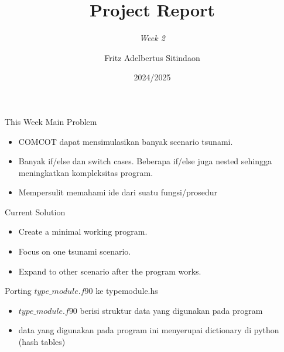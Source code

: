 \documentclass{beamer}
\title{Project Report}
\subtitle{\textit{Week 2}}
\date[]{2024/2025}
\author[Fritz]{Fritz Adelbertus Sitindaon}
\begin{document}
\begin{frame}
\titlepage
\end{frame}


\begin{frame}{This Week Main Problem}
    \begin{itemize}
        \item COMCOT dapat mensimulasikan banyak scenario tsunami.
        \item Banyak if/else dan switch cases. Beberapa if/else juga nested sehingga
        meningkatkan kompleksitas program.
        \item Mempersulit memahami ide dari suatu fungsi/prosedur
    \end{itemize}
\end{frame}

\begin{frame}{Current Solution}
    \begin{itemize}
        \item Create a minimal working program. 
        \item Focus on one tsunami scenario.
        \item Expand to other scenario after the program works.
    \end{itemize}
\end{frame}


\begin{frame}{Porting $type\_module.f90$ ke typemodule.hs}
    \begin{itemize}
        \item $type\_module.f90$ berisi struktur data yang digunakan pada program
        \item data yang digunakan pada program ini menyerupai dictionary di python (hash tables)
    \end{itemize}
\end{frame}
\end{document}

